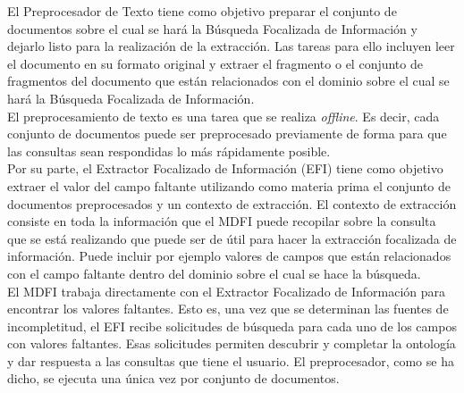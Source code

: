 El Preprocesador de Texto tiene como objetivo preparar el conjunto de documentos sobre el cual se hará la Búsqueda Focalizada de Información y dejarlo listo para la realización de la extracción. Las tareas para ello incluyen leer el documento en su formato original y extraer el fragmento o el conjunto de fragmentos del documento que están relacionados con el dominio sobre el cual se hará la Búsqueda Focalizada de Información.\\

El preprocesamiento de texto es una tarea que se realiza \emph{offline}. Es decir, cada conjunto de documentos puede ser preprocesado previamente de forma para que las consultas sean respondidas lo más rápidamente posible. \\

Por su parte, el Extractor Focalizado de Información (EFI) tiene como objetivo extraer el valor del campo faltante utilizando como materia prima el conjunto de documentos preprocesados y un contexto de extracción. El contexto de extracción consiste en toda la información que el MDFI puede recopilar sobre la consulta que se está realizando que puede ser de útil para hacer la extracción focalizada de información. Puede incluir por ejemplo valores de campos que están relacionados con el campo faltante dentro del dominio sobre el cual se hace la búsqueda.  \\

El MDFI trabaja directamente con el Extractor Focalizado de Información para encontrar los valores faltantes. Esto es, una vez que se determinan las fuentes de incompletitud, el EFI recibe solicitudes de búsqueda para cada uno de los campos con valores faltantes. Esas solicitudes permiten descubrir y completar la ontología y dar respuesta a las consultas que tiene el usuario. El preprocesador, como se ha dicho, se ejecuta una única vez por conjunto de documentos. \\

